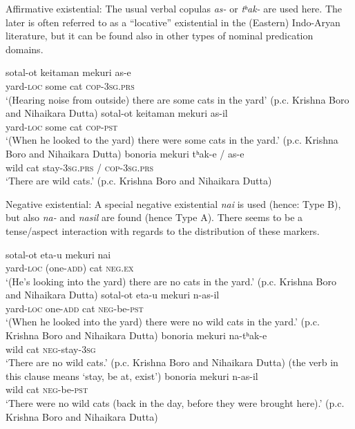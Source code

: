 \documentclass[output=paper]{langsci/langscibook}
\begin{document}
\begin{unindented}
Affirmative existential: The usual verbal copulas \textit{as-} or \textit{tʰak-} are used here. The later is often referred to as a “locative” existential in the (Eastern) Indo-Aryan literature, but it can be found also in other types of nominal predication domains.
%
\begin{exe}\ex \gll sotal-ot keitaman mekuri as-e \\
yard-\textsc{loc}  some cat \textsc{cop-3sg.prs} \\
    \glt `(Hearing noise from outside) there are some cats in the yard' (p.c. Krishna Boro and Nihaikara Dutta)
\ex \gll sotal-ot keitaman mekuri as-il \\
yard-\textsc{loc} some cat \textsc{cop-pst} \\
    \glt `(When he looked to the yard) there were some cats in the yard.' (p.c. Krishna Boro and Nihaikara Dutta)
\ex \gll bonoria mekuri tʰak-e / as-e \\
wild cat stay-\textsc{3sg.prs} / \textsc{cop-3sg.prs} \\
    \glt `There are wild cats.' (p.c. Krishna Boro and Nihaikara Dutta)
    \end{exe}

Negative existential: A special negative existential \textit{nai} is used
(hence: Type B), but also \textit{na-} and \textit{nasil} are found (hence
Type A). There seems to be a tense\slash aspect interaction with regards to the distribution of these markers.
%
\begin{exe}\ex \gll sotal-ot {\op}eta-u{\cp} mekuri nai \\
yard-\textsc{loc} (one-\textsc{add}) cat \textsc{neg.ex} \\
    \glt `(He's looking into the yard) there are no cats in the yard.' (p.c. Krishna Boro and Nihaikara Dutta)
\ex \gll sotal-ot {\op}eta-u{\cp} mekuri  n-as-il \\
yard-\textsc{loc} one-\textsc{add} cat \textsc{neg}-be-\textsc{pst} \\
    \glt `(When he looked into the yard) there were no wild cats in the yard.' (p.c. Krishna Boro and Nihaikara Dutta)
\ex \gll bonoria mekuri na-tʰak-e \\
wild cat \textsc{neg}-stay-\textsc{3sg} \\
    \glt `There are no wild cats.' (p.c. Krishna Boro and Nihaikara Dutta) (the verb in this clause means `stay, be at, exist')
\ex \gll bonoria mekuri n-as-il \\
wild cat \textsc{neg}-be-\textsc{pst} \\
    \glt `There were no wild cats (back in the day, before they were brought here).' (p.c. Krishna Boro and Nihaikara Dutta)
    \end{exe}


\end{unindented}
\end{document}
